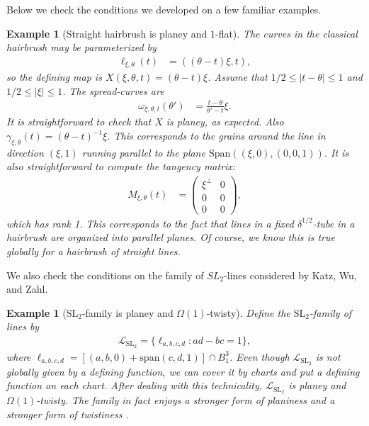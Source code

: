 \documentclass[12pt]{amsart}
\numberwithin{equation}{section}
\newtheorem{example}[lemma]{Example}
\newcommand{\1}{\mathbbm{1}}
\begin{document}
Below we check the conditions we developed on a few familiar examples. 
\begin{example}[Straight hairbrush is planey and $1$-flat]\label{ex: straight hairbrush}
    The curves in the classical hairbrush may be parameterized by 
    \begin{align}
        \ell_{\xi,\theta}(t) &= ((\theta-t) \xi, t),
    \end{align}
    so the defining map is $X(\xi, \theta,t) = (\theta-t)\xi$. Assume that $1/2 \leq |t- \theta| \leq 1$ and $1/2 \leq |\xi| \leq 1$.
    The spread-curves are 
    \begin{align}
        \omega_{\xi,\theta,t}(\theta') &= \frac{t-\theta}{\theta'-t} \xi.
    \end{align}
    It is straightforward to check that $X$ is planey, as expected. 
    Also $\gamma_{\xi,\theta}(t) = (\theta-t)^{-1} \xi$. This corresponds to the grains around the line in direction $(\xi, 1)$ running parallel to the plane $\mathrm{Span}((\xi,0), (0,0,1))$. 
    It is also straightforward to compute the tangency matrix: 
    \begin{align}
        M_{\xi,\theta}(t) &= 
        \begin{pmatrix}
            \xi^\perp & 0  \\
            0 & 0 \\
            0 & 0
        \end{pmatrix},
    \end{align}
    which has rank 1. This corresponds to the fact that lines in a fixed $\delta^{1/2}$-tube in a hairbrush are organized into parallel planes. Of course, we know this is true globally for a hairbrush of straight lines.
\end{example}

We also check the conditions on the family of $SL_2$-lines considered by Katz, Wu, and Zahl. 
\begin{example}[$\mathrm{SL}_2$-family is planey and $\Omega(1)$-twisty]\label{ex: SL2 family}
    Define the $\mathrm{SL}_2$-family of lines by 
    \begin{align}
        \mathcal L_{\mathrm{SL}_2} = \{\ell_{a,b,c,d} : ad - bc = 1\},
    \end{align}
    where $\ell_{a,b,c,d} = [(a,b,0) + \mathrm{span}(c,d,1)] \cap B_1^3$. 
    Even though $\mathcal L_{\mathrm{SL}_2}$ is not globally given by a defining function, we can cover it by charts and put a defining function on each chart. After dealing with this technicality, $\mathcal L_{\mathrm{SL}_2}$ is planey and $\Omega(1)$-twisty. The family in fact enjoys a stronger form of planiness \cite[Section 1.2.2]{KWZ} and a stronger form of twistiness \cite[Lemma 2.5]{KWZ}. 
\end{example}
\end{document}
